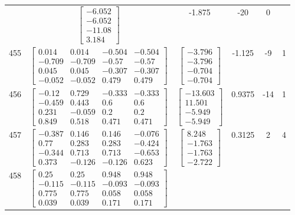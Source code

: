 \documentclass[a4paper,12pt]{article}
\begin{document}
\begin{tabular}{c c c c c c}
&
$\begin{bmatrix} -6.052 \\ -6.052 \\ -11.08 \\ 3.184 \end{bmatrix}$
&
-1.875
&
-20
&
0
\\
455
&
$\begin{bmatrix} 0.014 & 0.014 & -0.504 & -0.504 \\ -0.709 & -0.709 & -0.57 & -0.57 \\ 0.045 & 0.045 & -0.307 & -0.307 \\ -0.052 & -0.052 & 0.479 & 0.479 \end{bmatrix}$
&
$\begin{bmatrix} -3.796 \\ -3.796 \\ -0.704 \\ -0.704 \end{bmatrix}$
&
-1.125
&
-9
&
1
\\
456
&
$\begin{bmatrix} -0.12 & 0.729 & -0.333 & -0.333 \\ -0.459 & 0.443 & 0.6 & 0.6 \\ 0.231 & -0.059 & 0.2 & 0.2 \\ 0.849 & 0.518 & 0.471 & 0.471 \end{bmatrix}$
&
$\begin{bmatrix} -13.603 \\ 11.501 \\ -5.949 \\ -5.949 \end{bmatrix}$
&
0.9375
&
-14
&
1
\\
457
&
$\begin{bmatrix} -0.387 & 0.146 & 0.146 & -0.076 \\ 0.77 & 0.283 & 0.283 & -0.424 \\ -0.344 & 0.713 & 0.713 & -0.653 \\ 0.373 & -0.126 & -0.126 & 0.623 \end{bmatrix}$
&
$\begin{bmatrix} 8.248 \\ -1.763 \\ -1.763 \\ -2.722 \end{bmatrix}$
&
0.3125
&
2
&
4
\\
458
&
$\begin{bmatrix} 0.25 & 0.25 & 0.948 & 0.948 \\ -0.115 & -0.115 & -0.093 & -0.093 \\ 0.775 & 0.775 & 0.058 & 0.058 \\ 0.039 & 0.039 & 0.171 & 0.171 \end{bmatrix}$

\end{tabular}
\end{document}
